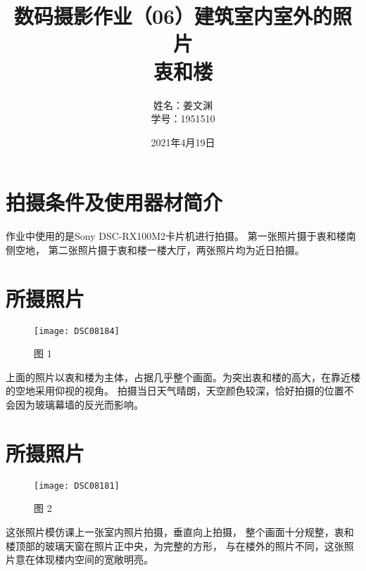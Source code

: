 \documentclass[cn,black,9pt,normal]{elegantnote}
\title{数码摄影作业（06）建筑室内室外的照片\\\small{衷和楼}}
\author{姓名：姜文渊\\学号：1951510}
\date{2021年4月19日}
\begin{document}
\maketitle


\section*{拍摄条件及使用器材简介}

作业中使用的是Sony DSC-RX100M2卡片机进行拍摄。
第一张照片摄于衷和楼南侧空地，
第二张照片摄于衷和楼一楼大厅，两张照片均为近日拍摄。

\section{所摄照片}
\begin{figure}[H]
    \centering
    \texttt{[image: DSC08184]}
    \caption{图 1}
    \label{F-01}
\end{figure}

上面的照片以衷和楼为主体，占据几乎整个画面。为突出衷和楼的高大，在靠近楼的空地采用仰视的视角。
拍摄当日天气晴朗，天空颜色较深，恰好拍摄的位置不会因为玻璃幕墙的反光而影响。

\section{所摄照片}
\begin{figure}[H]
    \centering
    \texttt{[image: DSC08181]}
    \caption{图 2}
    \label{F-02}
\end{figure}

这张照片模仿课上一张室内照片拍摄，垂直向上拍摄，
整个画面十分规整，衷和楼顶部的玻璃天窗在照片正中央，为完整的方形，
与在楼外的照片不同，这张照片意在体现楼内空间的宽敞明亮。

\end{document}
